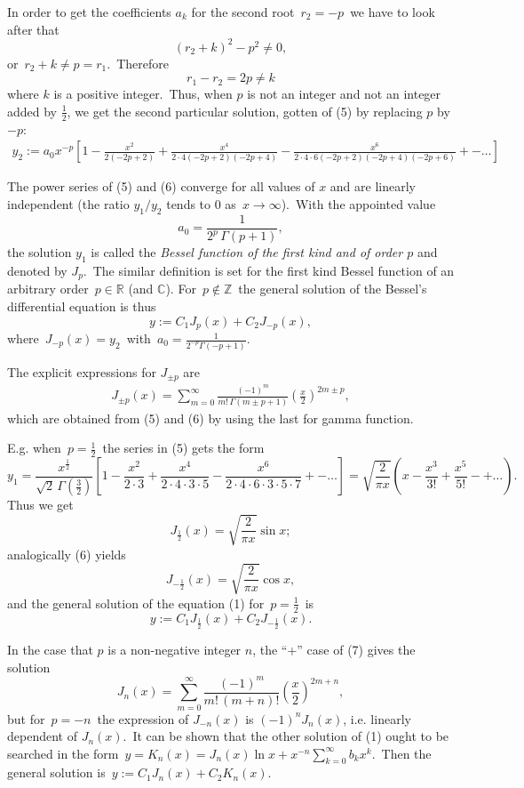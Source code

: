 \documentclass[12pt]{article}
\theoremstyle{plain}
\theoremstyle{definition}
\numberwithin{equation}{section}
\begin{document}
In order to get the coefficients $a_k$ for the second root\, $r_2 = -p$\, we have to look after that
$$(r_2+k)^2-p^2 \neq 0,$$
or\, $r_2+k \neq p = r_1$.\, Therefore
$$r_1-r_2 = 2p \neq k$$
where $k$ is a positive integer.\, Thus, when $p$ is not an integer and not an integer added by $\frac{1}{2}$, we get the second particular solution, gotten of (5) by replacing $p$ by $-p$:
\begin{align}
 y_2 := a_0x^{-p}\!\left[1
\!-\!\frac{x^2}{2(-2p\!+\!2)}\!+\!\frac{x^4}{2\!\cdot\!4(-2p\!+\!2)(-2p\!+\!4)}
\!-\!\frac{x^6}{2\!\cdot\!4\!\cdot\!6(-2p\!+\!2)(-2p\!+\!4)(-2p\!+\!6)}\!+-\ldots\right]
\end{align}

The power series of (5) and (6) converge for all values of $x$ and are linearly independent (the ratio $y_1/y_2$ tends to 0 as\, $x\to\infty$).\, With the appointed value
$$a_0 = \frac{1}{2^p\,\Gamma(p+1)},$$
the solution $y_1$ is called the {\em Bessel function of the first kind and of order $p$} and denoted by $J_p$.\, The similar definition is set for the first kind Bessel function of an arbitrary order\, $p\in \mathbb{R}$ (and $\mathbb{C}$).
 For\, $p\notin \mathbb{Z}$\, the general solution of the Bessel's differential equation is thus
$$y := C_1J_p(x)+C_2J_{-p}(x),$$
where\, $J_{-p}(x) = y_2$\, with\, $a_0 = \frac{1}{2^{-p}\Gamma(-p+1)}$.

The explicit expressions for $J_{\pm p}$ are
\begin{align}
J_{\pm p}(x) = 
 \sum_{m=0}^\infty 
  \frac{(-1)^m}{m!\,\Gamma(m\pm p+1)}\left(\frac{x}{2}\right)^{2m\pm p},
\end{align}
which are obtained from (5) and (6) by using the last  for gamma function.

E.g. when\, $p = \frac{1}{2}$\, the series in (5) gets the form
$$y_1 = \frac{x^{\frac{1}{2}}}{\sqrt{2}\,\Gamma(\frac{3}{2})}\left[1\!-\!\frac{x^2}{2\!\cdot\!3}\!+\!\frac{x^4}{2\!\cdot\!4\!\cdot\!3\!\cdot\!5}\!-\!\frac{x^6}{2\!\cdot\!4\cdot\!6\!\cdot\!3\!\cdot\!5\!\cdot\!7}\!+-\ldots\right] =
\sqrt{\frac{2}{\pi x}}\left(x\!-\!\frac{x^3}{3!}\!+\!\frac{x^5}{5!}\!-+\ldots\right).$$
Thus we get
$$J_{\frac{1}{2}}(x) = \sqrt{\frac{2}{\pi x}}\sin{x};$$
analogically (6) yields
$$J_{-\frac{1}{2}}(x) = \sqrt{\frac{2}{\pi x}}\cos{x},$$
and the general solution of the equation (1) for\, $p = \frac{1}{2}$\, is
$$y := C_1J_{\frac{1}{2}}(x)+C_2J_{-\frac{1}{2}}(x).$$


In the case that $p$ is a non-negative integer $n$, the ``+'' case of (7) gives the solution
$$J_{n}(x) = 
 \sum_{m=0}^\infty 
  \frac{(-1)^m}{m!\,(m+n)!}\left(\frac{x}{2}\right)^{2m+n},
$$
but for\, $p = -n$\, the expression of $J_{-n}(x)$ is $(-1)^nJ_n(x)$, i.e. linearly dependent of $J_n(x)$.\, It can be shown that the other solution of (1) ought to be searched in the form\, 
$y = K_n(x) = J_n(x)\ln{x}+x^{-n}\sum_{k=0}^\infty b_kx^k$.\, Then the general solution is\, $y := C_1J_n(x)+C_2K_n(x)$.\\
\end{document}

